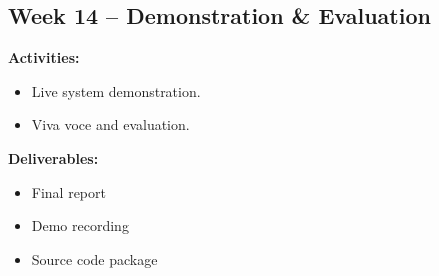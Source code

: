 \documentclass[12pt,a4paper]{article}
\begin{document}
\subsection*{Week 14 -- Demonstration \& Evaluation}
\textbf{Activities:}
\begin{itemize}[noitemsep]
    \item Live system demonstration.
    \item Viva voce and evaluation.
\end{itemize}
\textbf{Deliverables:}
\begin{itemize}[noitemsep]
    \item Final report
    \item Demo recording
    \item Source code package
\end{itemize}
\end{document}

